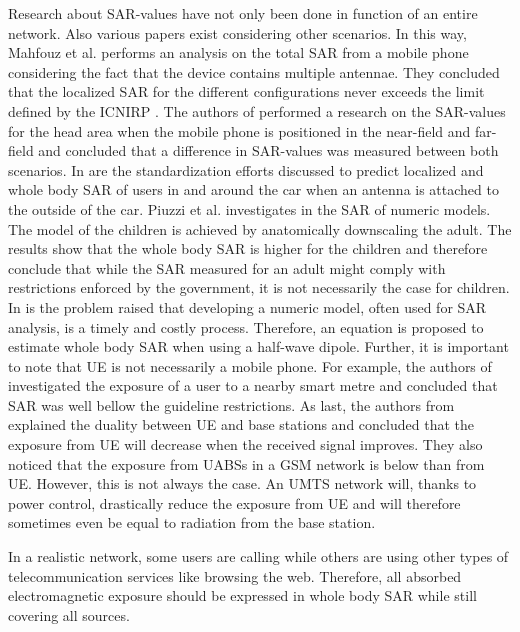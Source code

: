 Research about \gls{SAR}-values have not only been done in function of an entire network. Also various papers 
exist considering other scenarios. In this way,
Mahfouz et al. performs an analysis on the total \gls{SAR} from a mobile phone considering the fact that the device contains multiple antennae. They
concluded that the localized \gls{SAR} for the different configurations never exceeds the limit defined by the \gls{ICNIRP} \cite{P3}.
The authors of \cite{P5} performed a research on the \gls{SAR}-values for the head area when the mobile phone is positioned in the near-field and 
far-field and concluded that a difference in \gls{SAR}-values was measured between both scenarios.  In \cite{P7} are the standardization efforts discussed
 to predict localized and whole body \gls{SAR} of users in and around the car when an antenna is attached to the outside of the car.
 Piuzzi et al. investigates in \cite{P8} the \gls{SAR} of numeric models. The model of the children is achieved by anatomically downscaling the adult.
 The results show that the whole body \gls{SAR} is higher for the children and therefore conclude that while the \gls{SAR} measured for an adult 
 might comply with restrictions enforced by the government, it is not necessarily the case for children. In \cite{P10} is the problem raised 
 that developing a numeric model, often used for \gls{SAR} analysis, is a timely and costly process. Therefore, an equation is proposed to 
 estimate whole body \gls{SAR} when using a half-wave dipole. Further, it is important to note that 
 \gls{UE} is not necessarily a mobile phone. For example, the authors of \cite{P11} 
 investigated the exposure of a user to a nearby smart metre and concluded that \gls{SAR} was well bellow the guideline restrictions. 
 As last, the authors from \cite{J10.1.1} explained the duality between \gls{UE} and base stations and concluded that the exposure 
 from \gls{UE} will decrease when the received signal improves. They also noticed that the
 exposure from \gls{UABS}s in a \gls{GSM} network is below than from \gls{UE}. 
 However, this is not always the case. An \gls{UMTS} network will, thanks to power control,
 drastically reduce the exposure from \gls{UE} and will therefore sometimes even be equal to radiation from the base station.

In a realistic network, some users are calling while others are using other types of telecommunication services like browsing the web.
Therefore, all absorbed electromagnetic exposure should be expressed in whole body SAR while still covering all sources.

